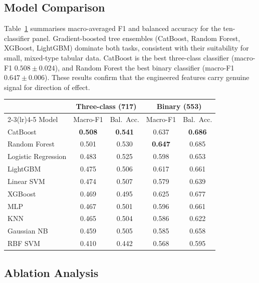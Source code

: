 \documentclass{ws-procs11x85}
\begin{document}
\subsection{Model Comparison}

Table~\ref{tab:results} summarises macro-averaged F1 and balanced
accuracy for the ten-classifier panel. Gradient-boosted tree ensembles
(CatBoost, Random Forest, XGBoost, LightGBM) dominate both tasks,
consistent with their suitability for small, mixed-type tabular data.
CatBoost is the best three-class classifier (macro-F1 $0.508 \pm 0.024$),
and Random Forest the best binary classifier (macro-F1 $0.647 \pm 0.006$).
These results confirm that the engineered features carry genuine signal
for direction of effect.

\begin{table}[ht]
{\begin{tabular}{@{}lcccc@{}}
\toprule
 & \multicolumn{2}{c}{Three-class (717)} & \multicolumn{2}{c}{Binary (553)} \\
\cmidrule(lr){2-3}\cmidrule(lr){4-5}
Model & Macro-F1 & Bal.\ Acc. & Macro-F1 & Bal.\ Acc. \\
\midrule
CatBoost            & \textbf{0.508} & \textbf{0.541} & 0.637 & \textbf{0.686} \\
Random Forest       & 0.501 & 0.530 & \textbf{0.647} & 0.685 \\
Logistic Regression & 0.483 & 0.525 & 0.598 & 0.653 \\
LightGBM            & 0.475 & 0.506 & 0.617 & 0.661 \\
Linear SVM          & 0.474 & 0.507 & 0.579 & 0.639 \\
XGBoost             & 0.469 & 0.495 & 0.625 & 0.677 \\
MLP                 & 0.467 & 0.501 & 0.596 & 0.661 \\
KNN                 & 0.465 & 0.504 & 0.586 & 0.622 \\
Gaussian NB         & 0.459 & 0.505 & 0.585 & 0.658 \\
RBF SVM             & 0.410 & 0.442 & 0.568 & 0.595 \\
\bottomrule
\end{tabular}}
\label{tab:results}
\end{table}

\subsection{Ablation Analysis}
\end{document}
